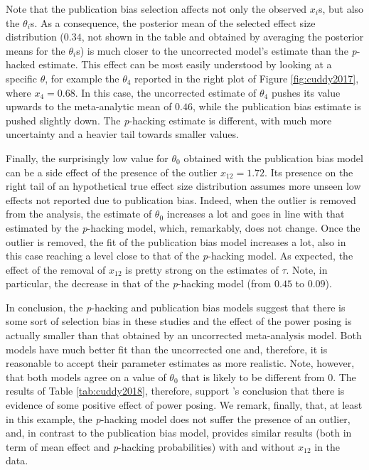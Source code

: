 \documentclass{article}
\theoremstyle{plain}
\theoremstyle{definition}
\begin{document}
Note that the publication bias selection affects not only the observed $x_{i}$s, but also the $\theta_{i}$s. As a consequence, the posterior mean of the selected effect size distribution ($0.34$, not shown in the table and obtained by averaging the posterior means for the $\theta_{i}$s) is much closer to the uncorrected model's estimate than the \textit{p}-hacked estimate. This effect can be most easily understood by looking at a specific $\theta$, for example the $\theta_4$ reported in the right plot of Figure \ref{fig:cuddy2017}, where $x_{4}=0.68$. In this case, the uncorrected estimate of $\theta_{4}$ pushes its value upwards to the meta-analytic mean of $0.46$, while the publication bias estimate is pushed slightly down. The \textit{p}-hacking estimate is different, with much more uncertainty and a heavier tail towards smaller values.

Finally, the surprisingly low value for $\theta_0$ obtained with the publication bias model can be a side effect of the presence of the outlier $x_{12} = 1.72$. Its presence on the right tail of an hypothetical true effect size distribution assumes more unseen low effects not reported due to publication bias. Indeed, when the outlier is removed from the analysis, the estimate of $\theta_{0}$ increases a lot and goes in line with that estimated by the \textit{p}-hacking model, which, remarkably, does not change. Once the outlier is removed, the fit of the publication bias model increases a lot, also in this case reaching a level close to that of the \textit{p}-hacking model. As expected, the effect of the removal of $x_{12}$ is pretty strong on the estimates of $\tau$. Note, in particular, the decrease in that of the \textit{p}-hacking model (from $0.45$ to $0.09$).



In conclusion, the \textit{p}-hacking and publication bias models suggest that there is some sort of selection bias in these studies and the effect of the power posing is actually smaller than that obtained by an uncorrected meta-analysis model. Both models have much better fit than the uncorrected one and, therefore, it is reasonable to accept their parameter estimates as more realistic. Note, however, that both models agree on  a value of $\theta_{0}$ that is likely to be different from $0$. The results of Table \ref{tab:cuddy2018}, therefore, support \citet{cuddy2018p}'s conclusion that there is evidence of some positive effect of power posing. We remark, finally, that, at least in this example, the \textit{p}-hacking model does not suffer the presence of an outlier, and, in contrast to the publication bias model, provides similar results (both in term of mean effect and \textit{p}-hacking probabilities) with and without $x_{12}$ in the data.
\end{document}
